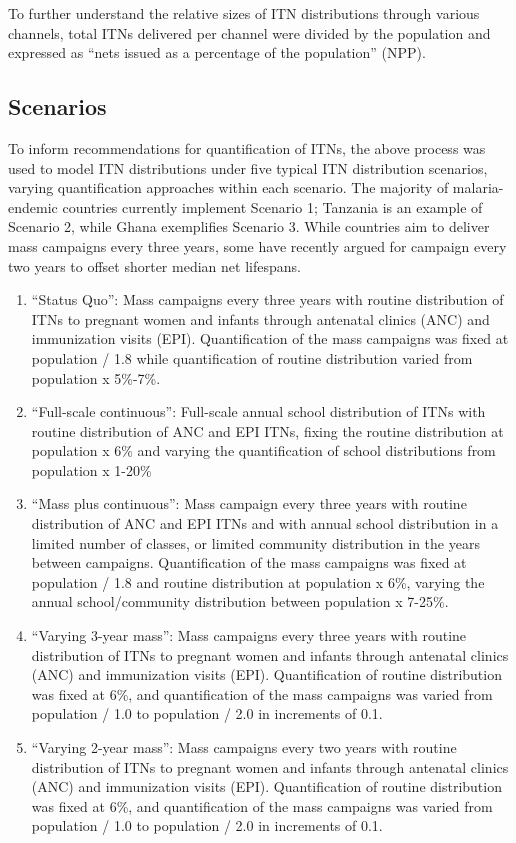 \documentclass[review,
3p]{elsarticle} %
\providecommand{\tightlist}{%
  \setlength{\itemsep}{0pt}\setlength{\parskip}{0pt}}
\begin{document}
To further understand the relative sizes of ITN distributions through
various channels, total ITNs delivered per channel were divided by the
population and expressed as ``nets issued as a percentage of the
population'' (NPP).

\hypertarget{scenarios}{%
\subsection{Scenarios}\label{scenarios}}

To inform recommendations for quantification of ITNs, the above process
was used to model ITN distributions under five typical ITN distribution
scenarios, varying quantification approaches within each scenario. The
majority of malaria-endemic countries currently implement Scenario 1;
Tanzania is an example of Scenario 2, while Ghana exemplifies Scenario
3. While countries aim to deliver mass campaigns every three years, some
have recently argued for campaign every two years to offset shorter
median net lifespans.

\begin{enumerate}
\def\labelenumi{\arabic{enumi}.}
\tightlist
\item
  ``Status Quo'': Mass campaigns every three years with routine
  distribution of ITNs to pregnant women and infants through antenatal
  clinics (ANC) and immunization visits (EPI). Quantification of the
  mass campaigns was fixed at population / 1.8 while quantification of
  routine distribution varied from population x 5\%-7\%.
\item
  ``Full-scale continuous'': Full-scale annual school distribution of
  ITNs with routine distribution of ANC and EPI ITNs, fixing the routine
  distribution at population x 6\% and varying the quantification of
  school distributions from population x 1-20\%
\item
  ``Mass plus continuous'': Mass campaign every three years with routine
  distribution of ANC and EPI ITNs and with annual school distribution
  in a limited number of classes, or limited community distribution in
  the years between campaigns. Quantification of the mass campaigns was
  fixed at population / 1.8 and routine distribution at population x
  6\%, varying the annual school/community distribution between
  population x 7-25\%.
\item
  ``Varying 3-year mass'': Mass campaigns every three years with routine
  distribution of ITNs to pregnant women and infants through antenatal
  clinics (ANC) and immunization visits (EPI). Quantification of routine
  distribution was fixed at 6\%, and quantification of the mass
  campaigns was varied from population / 1.0 to population / 2.0 in
  increments of 0.1.
\item
  ``Varying 2-year mass'': Mass campaigns every two years with routine
  distribution of ITNs to pregnant women and infants through antenatal
  clinics (ANC) and immunization visits (EPI). Quantification of routine
  distribution was fixed at 6\%, and quantification of the mass
  campaigns was varied from population / 1.0 to population / 2.0 in
  increments of 0.1.
\end{enumerate}
\end{document}
